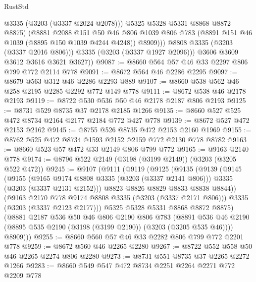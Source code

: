 \begin{lexlean}{RustStd}
\begin{coremodule}
{\begin{coremodule}
{{{{{{{{{{{{{{{                    @3335
                    (@3203 (@3337 @2024 @2078)))
                  @5325
                  @5328
                  @5331
                  @8868
                  @8872
                  @8875)
                (@8881
                  @2088
                  @151
                  @50
                  @46
                  @806
                  @1039
                  @806
                  @783
                  (@8891 @151 @46 @1039 (@8895 @150 @1039 @4244 @4248))
                  @8909)))
            @8808
            @3335
            (@3203 (@3337 @2016 @806)))
          @3335
          (@3203 (@3337 @1927 @2096)))
        @3606
        @3609
        @3612
        @3616
        @3621
        @3627))
@9087 := @8660 @564 @57 @46 @33 @2297 @806 @799 @772 @2114 @778
@9091 := @8672 @564 @46 @2286 @2295
@9097 := @8679 @563 @312 @46 @2286 @2293 @889
@9107 := @8660 @538 @562 @46 @258 @2195 @2285 @2292 @772 @149 @778
@9111 := @8672 @538 @46 @2178 @2193
@9119 := @8722 @530 @536 @50 @46 @2178 @2187 @806 @2193
@9125 := @8731 @529 @8735 @37 @2178 @2185 @1266
@9135 := @8660 @527 @525 @472 @8734 @2164 @2177 @2184 @772 @427 @778
@9139 := @8672 @527 @472 @2153 @2162
@9145 := @8755 @526 @8735 @472 @2153 @2160 @1969
@9155 := @8762 @525 @472 @8734 @1593 @2152 @2159 @772 @2130 @778 @8782
@9163 := @8660 @523 @57 @472 @33 @2149 @806 @799 @772
@9165 := @9163 @2140 @778
@9174 := @8796 @522 @2149 (@3198 (@3199 @2149)) (@3203 (@3205 @522 @472))
@9245 := @9107
    (@9111
      (@9119
        (@9125
          (@9135
            (@9139
              (@9145
                (@9155
                  (@9165 @9174 @8808 @3335 (@3203 (@3337 @2141 @806)))
                  @3335
                  (@3203 (@3337 @2131 @2152)))
                @8823
                @8826
                @8829
                @8833
                @8838
                @8844))
            (@9163 @2170 @778 @9174 @8808 @3335 (@3203 (@3337 @2171 @806)))
            @3335
            (@3203 (@3337 @2123 @2177)))
          @5325
          @5328
          @5331
          @8868
          @8872
          @8875)
        (@8881
          @2187
          @536
          @50
          @46
          @806
          @2190
          @806
          @783
          (@8891 @536 @46 @2190 (@8895 @535 @2190 (@3198 (@3199 @2190)) (@3203 (@3205 @535 @46))))
          @8909)))
@9255 := @8660 @560 @57 @46 @33 @2282 @806 @799 @772 @2201 @778
@9259 := @8672 @560 @46 @2265 @2280
@9267 := @8722 @552 @558 @50 @46 @2265 @2274 @806 @2280
@9273 := @8731 @551 @8735 @37 @2265 @2272 @1266
@9283 := @8660 @549 @547 @472 @8734 @2251 @2264 @2271 @772 @2209 @778
}}}}}}}}}}}}}}}
\end{coremodule}}
\end{coremodule}
\end{lexlean}
